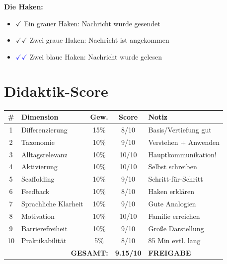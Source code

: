 \documentclass[11pt,a4paper]{article}
\begin{document}
\textbf{Die Haken:}
\begin{itemize}
    \item $\checkmark$ Ein grauer Haken: Nachricht wurde gesendet
    \item $\checkmark\checkmark$ Zwei graue Haken: Nachricht ist angekommen
    \item \textcolor{blue}{$\checkmark\checkmark$} Zwei blaue Haken: Nachricht wurde gelesen
\end{itemize}

\section{Didaktik-Score}

\begin{scorebox}
\begin{tabular}{|c|l|c|c|p{3.5cm}|}
\hline
\# & Dimension & Gew. & Score & Notiz \\
\hline
1 & Differenzierung & 15\% & 8/10 & Basis/Vertiefung gut \\
2 & Taxonomie & 10\% & 9/10 & Verstehen + Anwenden \\
3 & Alltagsrelevanz & 10\% & 10/10 & Hauptkommunikation! \\
4 & Aktivierung & 10\% & 10/10 & Selbst schreiben \\
5 & Scaffolding & 10\% & 9/10 & Schritt-für-Schritt \\
6 & Feedback & 10\% & 8/10 & Haken erklären \\
7 & Sprachliche Klarheit & 10\% & 9/10 & Gute Analogien \\
8 & Motivation & 10\% & 10/10 & Familie erreichen \\
9 & Barrierefreiheit & 10\% & 9/10 & Große Darstellung \\
10 & Praktikabilität & 5\% & 8/10 & 85 Min evtl. lang \\
\hline
\multicolumn{3}{|r|}{\textbf{GESAMT:}} & \textbf{9.15/10} & \textcolor{successgreen}{\textbf{FREIGABE}} \\
\hline
\end{tabular}
\end{scorebox}
\end{document}
